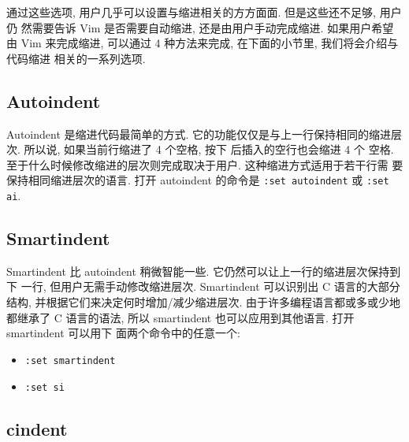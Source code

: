 通过这些选项, 用户几乎可以设置与缩进相关的方方面面. 但是这些还不足够, 用户仍
然需要告诉 Vim 是否需要自动缩进, 还是由用户手动完成缩进. 如果用户希望由 Vim
来完成缩进, 可以通过 4 种方法来完成, 在下面的小节里, 我们将会介绍与代码缩进
相关的一系列选项.

\subsection{Autoindent}
\label{subsec:autoindent}

Autoindent 是缩进代码最简单的方式. 它的功能仅仅是与上一行保持相同的缩进层次.
所以说, 如果当前行缩进了 4 个空格, 按下  后插入的空行也会缩进 4 个
空格. 至于什么时候修改缩进的层次则完成取决于用户. 这种缩进方式适用于若干行需
要保持相同缩进层次的语言. 打开 autoindent 的命令是 \texttt{:set autoindent}
或 \texttt{:set ai}.

\subsection{Smartindent}
\label{subsec:smartindent}

Smartindent 比 autoindent 稍微智能一些. 它仍然可以让上一行的缩进层次保持到下
一行, 但用户无需手动修改缩进层次. Smartindent 可以识别出 C 语言的大部分结构,
并根据它们来决定何时增加/减少缩进层次. 由于许多编程语言都或多或少地都继承了 C
语言的语法, 所以 smartindent 也可以应用到其他语言. 打开 smartindent 可以用下
面两个命令中的任意一个:
\begin{itemize}
    \item \texttt{:set smartindent}
    \item \texttt{:set si}
\end{itemize}

\subsection{cindent}
\label{subsec:cindent}

